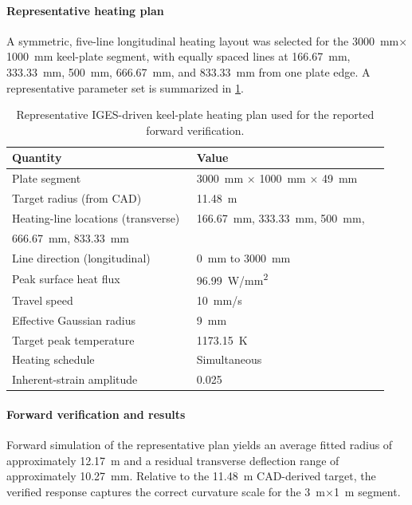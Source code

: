 \paragraph{Representative heating plan}
A symmetric, five-line longitudinal heating layout was selected for the \SI{3000}{mm}$\times$\SI{1000}{mm} keel-plate segment, with equally spaced lines at \SI{166.67}{mm}, \SI{333.33}{mm}, \SI{500}{mm}, \SI{666.67}{mm}, and \SI{833.33}{mm} from one plate edge. A representative parameter set is summarized in \cref{tab:iges-inverse-params}.

\begin{table}[H]
\centering
\caption{Representative IGES-driven keel-plate heating plan used for the reported forward verification.}
\label{tab:iges-inverse-params}
\begin{tabular}{p{0.46\linewidth}p{0.48\linewidth}}
\toprule
Quantity & Value \\
\midrule
Plate segment & \SI{3000}{mm} $\times$ \SI{1000}{mm} $\times$ \SI{49}{mm} \\
Target radius (from CAD) & \SI{11.48}{m} \\
Heating-line locations (transverse) & \SI{166.67}{mm}, \SI{333.33}{mm}, \SI{500}{mm},\\ \SI{666.67}{mm}, \SI{833.33}{mm} \\
Line direction (longitudinal) & \SI{0}{mm} to \SI{3000}{mm} \\
Peak surface heat flux & \SI{96.99}{W/mm^2} \\
Travel speed & \SI{10}{mm/s} \\
Effective Gaussian radius & \SI{9}{mm} \\
Target peak temperature & \SI{1173.15}{K} \\
Heating schedule & Simultaneous \\
Inherent-strain amplitude & 0.025 \\
\bottomrule
\end{tabular}
\end{table}

\paragraph{Forward verification and results}
Forward simulation of the representative plan yields an average fitted radius of approximately \SI{12.17}{m} and a residual transverse deflection range of approximately \SI{10.27}{mm}. Relative to the \SI{11.48}{m} CAD-derived target, the verified response captures the correct curvature scale for the \SI{3}{m}$\times$\SI{1}{m} segment.

